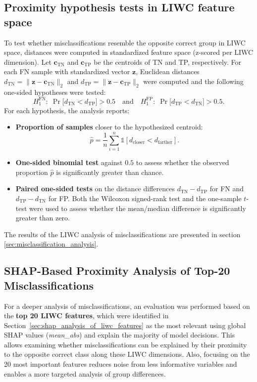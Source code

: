 \subsection{Proximity hypothesis tests in LIWC feature space}
To test whether misclassifications resemble the opposite correct group in LIWC space, distances were computed in standardized feature space (z-scored per LIWC dimension). Let \(\mathbf{c}_{\mathrm{TN}}\) and \(\mathbf{c}_{\mathrm{TP}}\) be the centroids of TN and TP, respectively. For each FN sample with standardized vector \(\mathbf{z}\), Euclidean distances
\(d_{\mathrm{TN}} = \|\mathbf{z}-\mathbf{c}_{\mathrm{TN}}\|_2\) and
\(d_{\mathrm{TP}} = \|\mathbf{z}-\mathbf{c}_{\mathrm{TP}}\|_2\) were computed and the following one-sided hypotheses were tested:
\[
H_{1}^{\mathrm{FN}}:\; \Pr\!\big[d_{\mathrm{TN}} < d_{\mathrm{TP}}\big] > 0.5
\quad\text{and}\quad
H_{1}^{\mathrm{FP}}:\; \Pr\!\big[d_{\mathrm{TP}} < d_{\mathrm{TN}}\big] > 0.5.
\]
For each hypothesis, the analysis reports:

\begin{itemize}
  \item \textbf{Proportion of samples} closer to the hypothesized centroid:
  \[\hat{p} = \frac{1}{n}\sum_{i=1}^{n} \mathbb{1}[d_{\text{closer}} < d_{\text{farther}}].\]
  \item \textbf{One-sided binomial test} against \(0.5\) to assess whether the observed proportion \(\hat{p}\) is significantly greater than chance.
  \item \textbf{Paired one-sided tests} on the distance differences \(d_{\mathrm{TN}} - d_{\mathrm{TP}}\) for FN and \(d_{\mathrm{TP}} - d_{\mathrm{TN}}\) for FP. Both the Wilcoxon signed-rank test and the one-sample \(t\)-test were used to assess whether the mean/median difference is significantly greater than zero.
\end{itemize}

The results of the LIWC analysis of misclassifications are presented in section \ref{sec:misclassification_analysis}.

\subsection{SHAP-Based Proximity Analysis of Top-20 Misclassifications}


For a deeper analysis of misclassifications, an evaluation was performed based on the \textbf{top 20 LIWC features}, which were identified in Section~\ref{sec:shap_analysis_of_liwc_features} as the most relevant using global SHAP values (\emph{mean\_abs}) and explain the majority of model decisions. This allows examining whether misclassifications can be explained by their proximity to the opposite correct class along these LIWC dimensions. Also, focusing on the 20 most important features reduces noise from less informative variables and enables a more targeted analysis of group differences.

